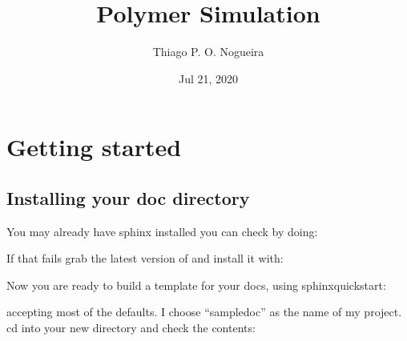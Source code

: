 \documentclass[letterpaper,10pt,english]{sphinxmanual}
\title{Polymer Simulation}
\date{Jul 21, 2020}
\author{Thiago P.\@{} O.\@{} Nogueira}
\begin{document}
\pagestyle{empty}
\sphinxmaketitle
\pagestyle{plain}
\sphinxtableofcontents
\pagestyle{normal}
\label{\detokenize{index::doc}}



\chapter{Getting started}
\label{\detokenize{getting_started:getting-started}}\label{\detokenize{getting_started:id1}}\label{\detokenize{getting_started::doc}}

\section{Installing your doc directory}
\label{\detokenize{getting_started:installing-your-doc-directory}}\label{\detokenize{getting_started:installing-docdir}}
You may already have sphinx 
installed \textendash{} you can check by doing:

\begin{sphinxVerbatim}[commandchars=\\\{\}]
  
\end{sphinxVerbatim}

If that fails grab the latest version of and install it with:

\begin{sphinxVerbatim}[commandchars=\\\{\}]
    
\end{sphinxVerbatim}

Now you are ready to build a template for your docs, using
sphinx\sphinxhyphen{}quickstart:

\begin{sphinxVerbatim}[commandchars=\\\{\}]
 
\end{sphinxVerbatim}

accepting most of the defaults.  I choose “sampledoc” as the name of my
project.  cd into your new directory and check the contents:

\begin{sphinxVerbatim}[commandchars=\\\{\}]
 
               
                      
\end{sphinxVerbatim}
\end{document}
